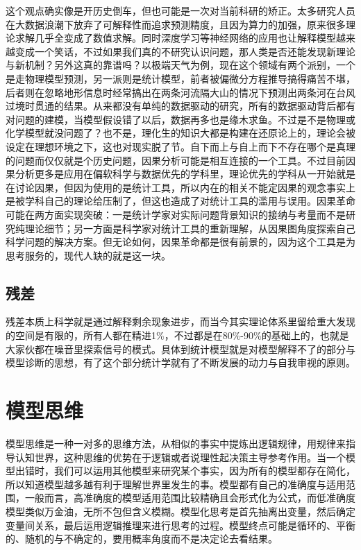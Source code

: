 \documentclass[]{tufte-book}
\begin{document}
这个观点确实像是开历史倒车，但也可能是一次对当前科研的矫正。太多研究人员在大数据浪潮下放弃了可解释性而追求预测精度，且因为算力的加强，原来很多理论求解几乎全变成了数值求解。同时深度学习等神经网络的应用也让解释模型越来越变成一个笑话，不过如果我们真的不研究认识问题，那人类是否还能发现新理论与新机制？另外这真的靠谱吗？以极端天气为例，现在这个领域有两个派别，一个是走物理模型预测，另一派则是统计模型，前者被偏微分方程推导搞得痛苦不堪，后者则在忽略地形信息时经常搞出在两条河流隔大山的情况下预测出两条河在台风过境时贯通的结果。从来都没有单纯的数据驱动的研究，所有的数据驱动背后都有对问题的建模，当模型假设错了以后，数据再多也是缘木求鱼。不过是不是物理或化学模型就没问题了？也不是，理化生的知识大都是构建在还原论上的，理论会被设定在理想环境之下，这也对现实脱了节。自下而上与自上而下不存在哪个是真理的问题而仅仅就是个历史问题，因果分析可能是相互连接的一个工具。不过目前因果分析更多是应用在偏软科学与数据优先的学科里，理论优先的学科从一开始就是在讨论因果，但因为使用的是统计工具，所以内在的相关不能定因果的观念事实上是被学科自己的理论给压制了，但这也造成了对统计工具的滥用与误用。因果革命可能在两方面实现突破：一是统计学家对实际问题背景知识的接纳与考量而不是研究纯理论细节；另一方面是科学家对统计工具的重新理解，从因果图角度探索自己科学问题的解决方案。但无论如何，因果革命都是很有前景的，因为这个工具是为思考服务的，现代人缺的就是这一块。

\hypertarget{ux6b8bux5dee}{%
\subsection{残差}\label{ux6b8bux5dee}}

残差本质上科学就是通过解释剩余现象进步，而当今其实理论体系里留给重大发现的空间是有限的，所有人都在精进1\%，不过都是在80\%-90\%的基础上的，也就是大家伙都在噪音里探索信号的模式。具体到统计模型就是对模型解释不了的部分与模型诊断的思想，有了这个部分统计学就有了不断发展的动力与自我审视的原则。

\hypertarget{ux6a21ux578bux601dux7ef4}{%
\section{模型思维}\label{ux6a21ux578bux601dux7ef4}}

模型思维是一种一对多的思维方法，从相似的事实中提炼出逻辑规律，用规律来指导认知世界，这种思维的优势在于逻辑或者说理性起决策主导参考作用。当一个模型出错时，我们可以运用其他模型来研究某个事实，因为所有的模型都存在简化，所以知道模型越多越有利于理解世界里发生的事。模型都有自己的准确度与适用范围，一般而言，高准确度的模型适用范围比较精确且会形式化为公式，而低准确度模型类似万金油，无所不包但含义模糊。模型化思考是首先抽离出变量，然后确定变量间关系，最后运用逻辑推理来进行思考的过程。模型终点可能是循环的、平衡的、随机的与不确定的，要用概率角度而不是决定论去看结果。
\end{document}
